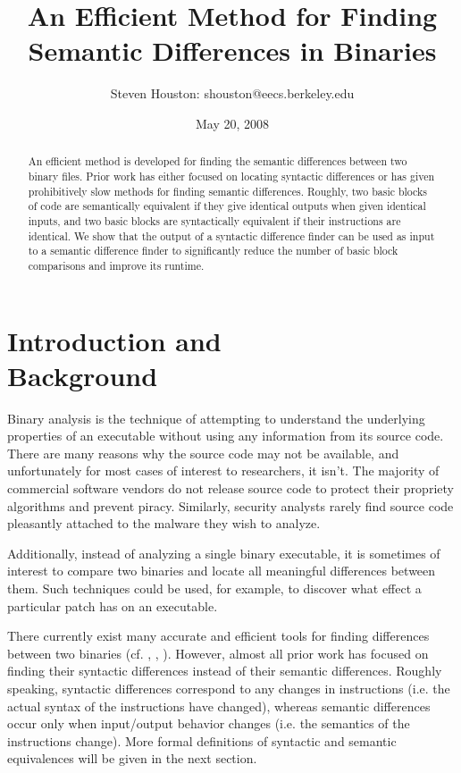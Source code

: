 \documentclass[11pt,twocolumn]{article}
\title{An Efficient Method for Finding Semantic Differences in Binaries }
\author{Steven Houston: shouston@eecs.berkeley.edu}
\date{May 20, 2008}
\begin{document}
\maketitle

\begin{abstract}
An efficient method is developed for finding the semantic differences between two binary files.
Prior work has either focused on locating syntactic differences or has given prohibitively slow methods for finding semantic differences.
Roughly, two basic blocks of code are semantically equivalent if they give identical outputs when given identical inputs, and two basic blocks are syntactically equivalent if their instructions are identical. 
We show that the output of a syntactic difference finder can be used as input to a semantic difference finder to significantly reduce the number of basic block comparisons and improve its runtime.
\end{abstract}

\section{Introduction and \\Background}
Binary analysis is the technique of attempting to understand the underlying properties of an executable without using any information from its source code.
There are many reasons why the source code may not be available, and unfortunately for most cases of interest to researchers, it isn't.
The majority of commercial software vendors do not release source code
to protect  their propriety algorithms and prevent piracy.
Similarly, security analysts rarely find source code pleasantly attached to the malware they wish to analyze.

Additionally, instead of analyzing a single binary executable, it is sometimes of interest to compare two binaries and locate all meaningful differences between them.  Such techniques could be used, for example, to discover what effect a particular patch has on an executable.

There currently exist many accurate and efficient tools for finding differences between two binaries (cf. \cite{BinDiff2}, \cite{eEye}, \cite{BinDiff}).  However, almost all prior work has focused on finding their syntactic differences instead of their semantic differences.  Roughly speaking, syntactic differences correspond to any changes in instructions (i.e. the actual syntax of the instructions have changed), whereas semantic differences occur only when input/output behavior changes (i.e. the semantics of the instructions change).  More formal definitions of syntactic and semantic equivalences will be given in the next section.  
\end{document}
